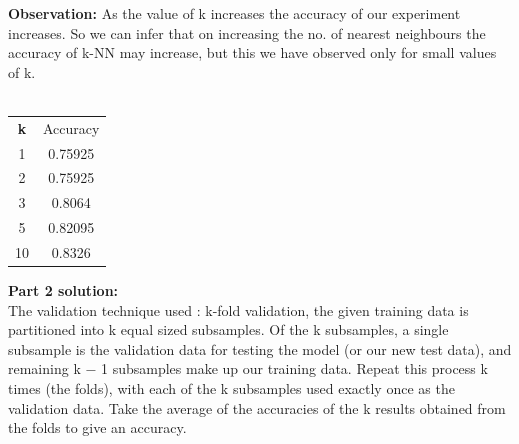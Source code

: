 \documentclass[a4paper,11pt]{article}
\begin{document}
\begin{mlsolution}
\textbf{Observation:} As the value of k increases the accuracy of our experiment increases. So we can infer that on increasing the no. of nearest neighbours the accuracy of k-NN may increase, but this we have observed only for small values of k. \\\\

\begin{center}
 \begin{tabular}{|c|c|} 
 \hline
 \textbf{k} & Accuracy \\ [0.5ex] 
 
 1 & 0.75925 \\ 
 
 2 & 0.75925   \\
 
 3 & 0.8064   \\
 
 5 & 0.82095   \\
 
 10 & 0.8326   \\ [1ex] 
 \hline
\end{tabular}
\end{center}

\textbf{Part 2 solution:}\\

The validation technique used : k-fold validation, the given training data is partitioned into k equal sized subsamples. Of the k subsamples, a single subsample is the validation data for testing the model (or our new test data), and remaining k − 1 subsamples make up our training data. Repeat this process k times (the folds), with each of the k subsamples used exactly once as the validation data. Take the average of the accuracies of the k results obtained from the folds to give an accuracy.


\end{mlsolution}
\end{document}
